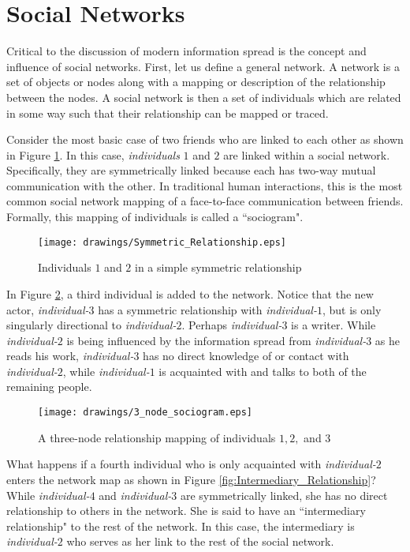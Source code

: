 \section{Social Networks}
Critical to the discussion of modern information spread is the concept and influence of social networks. First, let us define a general network. A network is a set of objects or nodes along with a mapping or description of the relationship between the nodes. \cite{kadushin2012understanding} A social network is then a set of individuals which are related in some way such that their relationship can be mapped or traced. 

Consider the most basic case of two friends who are linked to each other as shown in Figure \ref{fig:Symmetric_Relationship}. In this case, \textit{individuals}  $1$ and $2$ are linked within a social network. Specifically, they are symmetrically linked because each has two-way mutual communication with the other. In traditional human interactions, this is the most common social network mapping of a face-to-face communication between friends. Formally, this mapping of individuals is called a ``sociogram".
\begin{figure}[!htbp] \centering
  \texttt{[image: drawings/Symmetric\_Relationship.eps]}
  \caption{Individuals $1$ and $2$ in a simple symmetric relationship}
  \label{fig:Symmetric_Relationship}
\end{figure}
In Figure \ref{fig:3_node_sociogram1}, a third individual is added to the network. Notice that the new actor, \textit{individual-$3$} has a symmetric relationship with \textit{individual-$1$}, but is only singularly directional to \textit{individual-$2$}. Perhaps \textit{individual-$3$} is a writer. While \textit{individual-$2$} is being influenced by the information spread from \textit{individual-$3$} as he reads his work, \textit{individual-$3$} has no direct knowledge of or contact with \textit{individual-$2$}, while \textit{individual-$1$} is acquainted with and talks to both of the remaining people. 
\begin{figure}[!htbp] \centering
  \texttt{[image: drawings/3\_node\_sociogram.eps]}
  \caption{A three-node relationship mapping of individuals $1, 2,$ and $3$}
  \label{fig:3_node_sociogram1}
\end{figure}
What happens if a fourth individual who is only acquainted with \textit{individual-$2$} enters the network map as shown in Figure \ref{fig:Intermediary_Relationship}? While \textit{individual-$4$} and \textit{individual-$3$} are symmetrically linked, she has no direct relationship to others in the network. She is said to have an ``intermediary relationship" to the rest of the network. In this case, the intermediary is \textit{individual-$2$} who serves as her link to the rest of the social network.
